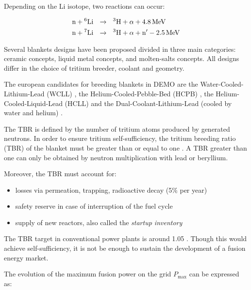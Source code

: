 
Depending on the Li isotope, two reactions can occur:

\begin{align}
    \text{n} + \text{\textsuperscript{6}Li}  \ \ &\xrightarrow{} \ \ \text{\textsuperscript{3}H} + \alpha + \SI{4.8}{MeV}\\
    \text{n} + \text{\textsuperscript{7}Li}  \ \ &\xrightarrow{} \ \ \text{\textsuperscript{3}H} + \alpha + \text{n}' - \SI{2.5}{MeV} 
\end{align}

Several blankets designs have been proposed divided in three main categories: ceramic concepts, liquid metal concepts, and molten-salts concepts.
All designs differ in the choice of tritium breeder, coolant and geometry.

The european candidates for breeding blankets in DEMO are the Water-Cooled-Lithium-Lead (WCLL) , the Helium-Cooled-Pebble-Bed (HCPB) , the Helium-Cooled-Liquid-Lead (HCLL)  and the Dual-Coolant-Lithium-Lead (cooled by water and helium)  .

The TBR is defined by the number of tritium atoms produced by generated neutrons.
In order to ensure tritium self-sufficiency, the tritium breeding ratio (TBR) of the blanket must be greater than or equal to one .
A TBR greater than one can only be obtained by neutron multiplication with lead or beryllium.

Moreover, the TBR must account for:
\begin{itemize}
    \item losses via permeation, trapping, radioactive decay (5\% per year)
    \item safety reserve in case of interruption of the fuel cycle
    \item supply of new reactors, also called the \textit{startup inventory}
\end{itemize}

The TBR target in conventional power plants is around 1.05 .
Though this would achieve self-sufficiency, it is not be enough to sustain the development of a fusion energy market.

The evolution of the maximum fusion power on the grid $P_\mathrm{max}$ can be expressed as:

